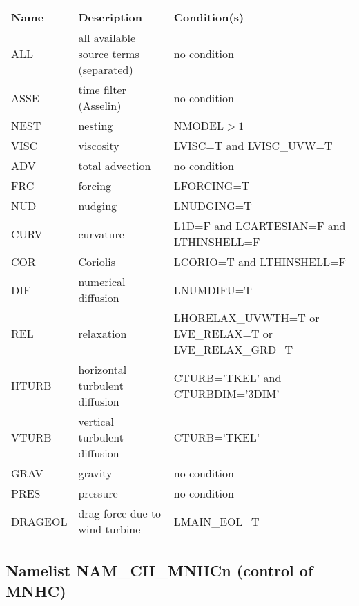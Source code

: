 \begin{longtable} {|p{}|p{}|p{}|}
\hline
Name & Description & Condition(s) \\
\hline \hline
\endhead
ALL     & all available source terms (separated) & no condition \\\hline \hline
ASSE    & time filter (Asselin)          & no condition                            \\\hline
NEST    & nesting                        & NMODEL$>1$                              \\\hline
VISC    & viscosity                      & LVISC=T and LVISC\_UVW=T                \\\hline
ADV     & total advection                & no condition                            \\\hline
FRC     & forcing                        & LFORCING=T                              \\\hline
NUD     & nudging                        & LNUDGING=T                              \\\hline
CURV    & curvature                      & L1D=F and LCARTESIAN=F and LTHINSHELL=F \\\hline
COR     & Coriolis                       & LCORIO=T and LTHINSHELL=F               \\\hline
DIF     & numerical diffusion            & LNUMDIFU=T                              \\\hline
REL     & relaxation                     & LHORELAX\_UVWTH=T or LVE\_RELAX=T or LVE\_RELAX\_GRD=T \\\hline
HTURB   & horizontal turbulent diffusion & CTURB='TKEL' and CTURBDIM='3DIM'        \\\hline
VTURB   & vertical turbulent diffusion   & CTURB='TKEL'                            \\\hline
GRAV    & gravity                        & no condition                            \\\hline
PRES    & pressure                       & no condition                            \\\hline
DRAGEOL & drag force due to wind turbine & LMAIN\_EOL=T                            \\\hline
\end{longtable}



\newpage

\subsection{Namelist NAM\_CH\_MNHCn (control of MNHC)}
\label{ss:chem}

